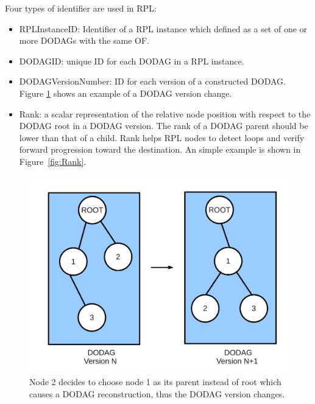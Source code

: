 Four types of identifier are used in RPL:
\begin{itemize}
\item RPLInstanceID: Identifier of a RPL instance which defined as a set of one or more DODAGs with the same OF.


\item DODAGID: unique ID for each DODAG in a RPL instance.


\item DODAGVersionNumber: ID for each version of a constructed DODAG. Figure \ref{fig:DODAGVersion} shows an example of a DODAG version change.

\item Rank: a scalar representation of the relative node position with respect to the DODAG root in a DODAG version. 
The rank of a DODAG parent should be lower than that of a child. Rank helps RPL nodes to detect loops and verify forward progression toward the destination. An simple example is shown in Figure~\ref{fig:Rank}.
\end{itemize}

\begin{figure}[htbp]
  \begin{center}
    \leavevmode
      \includegraphics[scale=0.3]{Pics/DODAGVersion.pdf}
    \caption{Node 2 decides to choose node 1 as its parent instead of root which causes a DODAG reconstruction, thus the DODAG version changes.}
    \label{fig:DODAGVersion}
  \end{center}
\end{figure}

